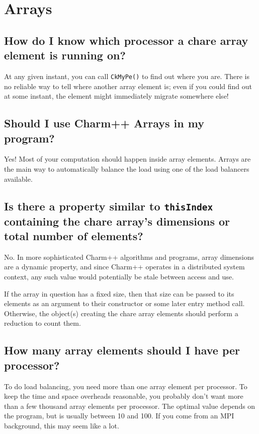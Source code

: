 \section{\charmpp{} Arrays}

\subsection{How do I know which processor a chare array element is running on?}

At any given instant, you can call {\tt CkMyPe()} to find out where
you are. There is no reliable way to tell where another array element is;
even if you could find out at some instant, the element might immediately
migrate somewhere else!

\subsection{Should I use Charm++ Arrays in my program?}

Yes! Most of your computation should happen inside array elements.
Arrays are the main way to automatically balance the load using one of the
load balancers available.

\subsection{Is there a property similar to {\tt thisIndex} containing the chare
array's dimensions or total number of elements?}

No. In more sophisticated Charm++ algorithms and programs, array dimensions are
a dynamic property, and since Charm++ operates in a distributed system context,
any such value would potentially be stale between access and use.

If the array in question has a fixed size, then that size can be passed to its
elements as an argument to their constructor or some later entry method call.
Otherwise, the object(s) creating the chare array elements should perform a
reduction to count them.

\subsection{How many array elements should I have per processor?}

To do load balancing, you need more than one array element per processor.
To keep the time and space overheads reasonable, you probably don't want
more than a few thousand array elements per processor. The optimal
value depends on the program, but is usually between 10 and 100.
If you come from an MPI background, this may seem like a lot.

